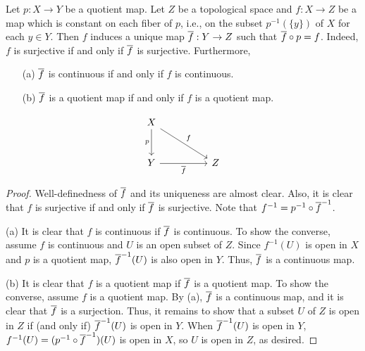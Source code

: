 \begin{thm}
    Let $p: X\rightarrow Y$ be a quotient map.
    Let $Z$ be a topological space and $f: X\rightarrow Z$ be a map which is constant on each fiber of $p$, i.e., on the subset $p^{-1}(\{y\})$ of $X$ for each $y\in Y$.
    Then $f$ induces a unique map $\overline{f}: Y\rightarrow Z$ such that $\overline{f}\circ p=f$.
    Indeed, $f$ is surjective if and only if $\overline{f}$ is surjective.
    Furthermore,
    \begin{enumerate}
        \item[(a)]
        {
            $\overline{f}$ is continuous if and only if $f$ is continuous.
        }
        \item[(b)]
        {
            $\overline{f}$ is a quotient map if and only if $f$ is a quotient map.
        }
    \end{enumerate}
    \begin{equation*}
    \begin{tikzcd}[row sep=large, column sep=huge]
        X
        \arrow[d, "p"']
        \arrow[dr, "f"]
        &\\
        Y\arrow[r, "\ol{f}"']
        &
        Z
    \end{tikzcd}
    \end{equation*}
\end{thm}
\begin{proof}
    Well-definedness of $\overline{f}$ and its uniqueness are almost clear.
    Also, it is clear that $f$ is surjective if and only if $\overline{f}$ is surjective.
    Note that $f^{-1}=p^{-1}\circ\overline{f}^{-1}$.

    \hangindent=0.65cm
    \noindent(a)
    It is clear that $f$ is continuous if $\overline{f}$ is continuous.
    To show the converse, assume $f$ is continuous and $U$ is an open subset of $Z$.
    Since $f^{-1}(U)$ is open in $X$ and $p$ is a quotient map, $\overline{f}^{-1}(U)$ is also open in $Y$.
    Thus, $\overline{f}$ is a continuous map.

    \noindent(b)
    It is clear that $f$ is a quotient map if $\overline{f}$ is a quotient map.
    To show the converse, assume $f$ is a quotient map.
    By (a), $\overline{f}$ is a continuous map, and it is clear that $\overline{f}$ is a surjection.
    Thus, it remains to show that a subset $U$ of $Z$ is open in $Z$ if (and only if) $\overline{f}^{-1}(U)$ is open in $Y$.
    When $\overline{f}^{-1}(U)$ is open in $Y$, $f^{-1}(U)=(p^{-1}\circ\overline{f}^{-1})(U)$ is open in $X$, so $U$ is open in $Z$, as desired.
\end{proof}

